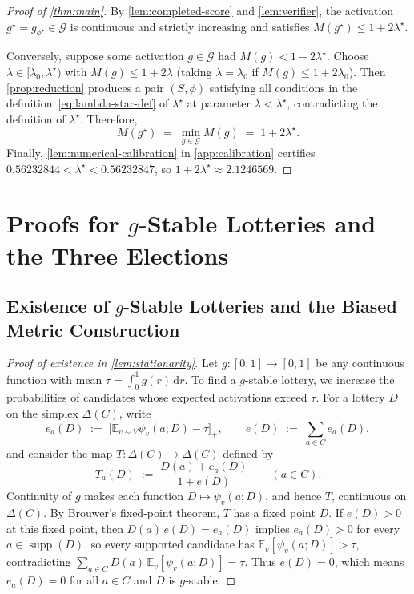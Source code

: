 \documentclass[11pt]{article}
\numberwithin{equation}{section}
\theoremstyle{plain}
\theoremstyle{definition}
\newcommand{\E}{\mathbb{E}}
\newcommand{\1}{\mathbf{1}}
\newcommand{\supp}{\operatorname{supp}}
\newcommand{\calG}{\mathcal{G}}
\begin{document}
\begin{proof}[Proof of {\cref{thm:main}}]
By \cref{lem:completed-score} and \cref{lem:verifier}, the activation $g^\star = g_{\phi^\star} \in \calG$ is continuous and strictly increasing and satisfies $M(g^\star) \le 1 + 2\lambda^\star$.

Conversely, suppose some activation $g \in \calG$ had $M(g) < 1 + 2\lambda^\star$. Choose $\lambda \in [\lambda_0, \lambda^\star)$ with $M(g) \le 1 + 2\lambda$ (taking $\lambda = \lambda_0$ if $M(g) \le 1 + 2\lambda_0$). Then \cref{prop:reduction} produces a pair $(S, \phi)$ satisfying all conditions in the definition~\eqref{eq:lambda-star-def} of $\lambda^\star$ at parameter $\lambda < \lambda^\star$, contradicting the definition of $\lambda^\star$. Therefore,
\[
  M(g^\star) \;=\; \min_{g \in \calG} M(g) \;=\; 1 + 2\lambda^\star.
\]
Finally, \cref{lem:numerical-calibration} in \cref{app:calibration} certifies $0.56232844 < \lambda^\star < 0.56232847$, so $1 + 2\lambda^\star \approx 2.1246569$.
\end{proof}

\appendix
{}

\section{Proofs for \texorpdfstring{$g$}{g}-Stable Lotteries and the Three Elections}
\label{app:elections}

\subsection{Existence of \texorpdfstring{$g$}{g}-Stable Lotteries and the Biased Metric Construction}
\label{app:existence}

\begin{proof}[Proof of existence in {\cref{lem:stationarity}}]
Let $g \colon [0, 1] \to [0, 1]$ be any continuous function with mean $\tau = \int_0^1 g(r)\,\mathrm{d}r$. To find a $g$-stable lottery, we increase the probabilities of candidates whose expected activations exceed $\tau$. For a lottery $D$ on the simplex $\Delta(C)$, write
\[
  e_a(D) \;:=\; \bigl[\E_{v \sim V}\psi_v(a; D) - \tau\bigr]_+,
  \qquad
  e(D) \;:=\; \sum_{a \in C} e_a(D),
\]
and consider the map $T \colon \Delta(C) \to \Delta(C)$ defined by
\[
  T_a(D) \;:=\; \frac{D(a) + e_a(D)}{1 + e(D)}
  \qquad (a \in C).
\]
Continuity of $g$ makes each function $D \mapsto \psi_v(a; D)$, and hence $T$, continuous on $\Delta(C)$. By Brouwer's fixed-point theorem, $T$ has a fixed point $D$. If $e(D) > 0$ at this fixed point, then $D(a)\,e(D) = e_a(D)$ implies $e_a(D) > 0$ for every $a \in \supp(D)$, so every supported candidate has $\E_v[\psi_v(a; D)] > \tau$, contradicting $\sum_{a \in C} D(a)\,\E_v[\psi_v(a; D)] = \tau$. Thus $e(D) = 0$, which means $e_a(D) = 0$ for all $a \in C$ and $D$ is $g$-stable.
\end{proof}
\end{document}
